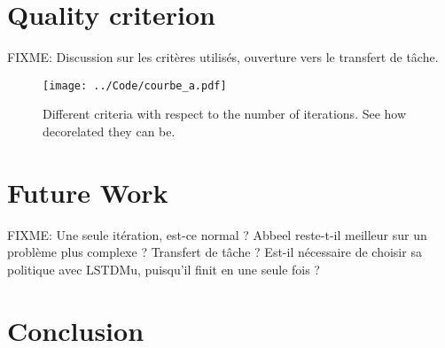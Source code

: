 \documentclass{article}
\begin{document}
\section{Quality criterion}
FIXME: Discussion sur les critères utilisés, ouverture vers le transfert de tâche.
\begin{figure}
\texttt{[image: ../Code/courbe\_a.pdf]}
\caption{Different criteria with respect to the number of iterations. See how decorelated they can be.}
\label{fig:A}
\end{figure}
\section{Future Work}
FIXME: Une seule itération, est-ce normal ? Abbeel reste-t-il meilleur sur un problème plus complexe ? Transfert de tâche ? Est-il nécessaire de choisir sa politique avec LSTDMu, puisqu'il finit en une seule fois ?
\section{Conclusion}


\end{document}
